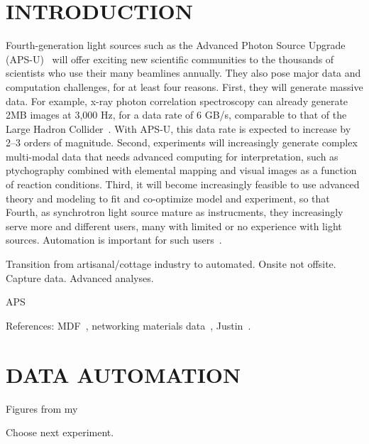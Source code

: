 \documentclass{aip-cp}
\newcommand\ian[1]{}
\newcommand\ian[1]{{\color{red}[Ian: #1]}}
\begin{document}
\ian{Potential authors: Tekin Bicer, Ben Blaiszik, Kyle Chard, Ryan Chard, Logan Ward, Justin Wozniak, ...}


\section{INTRODUCTION}

Fourth-generation light sources such as the Advanced Photon Source Upgrade (APS-U)~\cite{APSU} will offer exciting new
scientific communities to the thousands of scientists who use their many beamlines annually.
They also pose major data and computation challenges, for at least four reasons.
First, they will generate massive data. 
For example, x-ray photon correlation spectroscopy can already generate 2MB images at 3,000 Hz,
for a data rate of 6 GB/s, comparable to that of the Large Hadron Collider~\cite{lhcrate}.
With APS-U, this data rate is expected to increase by 2--3 orders of magnitude.
Second, experiments will increasingly generate complex multi-modal data that needs advanced computing
for interpretation, such as ptychography combined with 
elemental mapping and visual images as a function of reaction conditions.
Third, it will become increasingly feasible to use advanced theory and modeling to fit and co-optimize 
model and experiment, so that 
Fourth, as synchrotron light source mature as instrucments, they increasingly serve more and different users,
many with limited or no experience with light sources. 
Automation is important for such users~\cite{hiraki2008high,toby2009management}.


Transition from artisanal/cottage industry to automated. Onsite not offsite. Capture data. Advanced analyses.

APS~\cite{toby2015practices}

References: MDF~\cite{MDF2016}, networking materials data~\cite{foster2015networking}, Justin~\cite{wozniak2015big}.


\section{DATA AUTOMATION}

\ian{Big picture thoughts I guess.}

Figures from my 

Choose next experiment.

 
\ian{Next text and Figure~\ref{fig:diffuse} are from~\cite{foster2015networking}. Need to be rewritten.}
\end{document}
